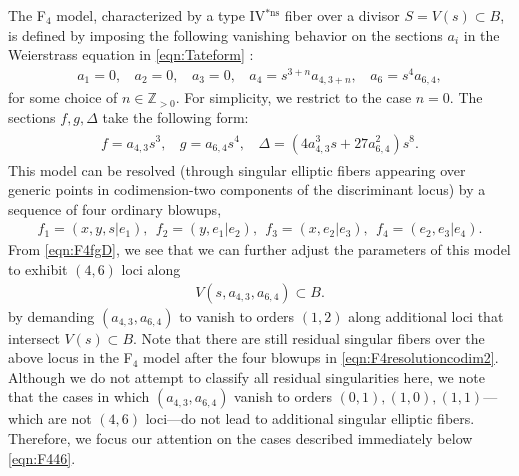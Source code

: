 \documentclass[11pt,oneside,english]{article}
\numberwithin{equation}{section}
\theoremstyle{definition}
\begin{document}
The F$_4$ model, characterized by a type IV$^{*\text{ns}}$ fiber over a divisor $S  = V(s) \subset B$, is defined by imposing the following vanishing behavior on the sections $a_i$ in the Weierstrass equation in \cref{eqn:Tateform} \cite{Esole:2017kyr,Esole:2017rgz}:
	\begin{align}
		a_1 = 0,~~~~ a_2=0,~~~~ a_3 = 0,~~~~ a_4 = s^{3+n} a_{4,3+n} ,~~~~ a_6 =s^4 a_{6,4},
	\end{align}
for some choice of $n \in \mathbb Z_{>0}$. For simplicity, we restrict to the case $n = 0$. The sections $f,g,\Delta$ take the following form:
	\begin{align}	
		\begin{split}
		\label{eqn:F4fgD}
		f = a_{4,3} s^3,~~~~g= a_{6,4} s^4,~~~~\Delta = ( 4 a_{4,3}^3 s+ 27 a_{6,4}^2 ) s^8. 
		\end{split}
	\end{align}
This model can be resolved (through singular elliptic fibers appearing over generic points in codimension-two components of the discriminant locus) by a sequence of four ordinary blowups,
	\begin{align}
		\label{eqn:F4resolutioncodim2}
			 f_1 = (x,y,s|e_1),~~f_2 = (y,e_1|e_2),~~ f_3=(x,e_2|e_3) ,~~ f_4 =  (e_2,e_3|e_4).
	\end{align}
From \cref{eqn:F4fgD}, we see that we can further adjust the parameters of this model to exhibit $(4,6)$ loci along
\begin{align}
	\label{eqn:F446}
		V(s , a_{4,3} , a_{6,4}) \subset B.
	\end{align}
 by demanding $(a_{4,3}, a_{6,4})$ to vanish to orders $(1,2)$ along additional loci that intersect $V(s) \subset B$. 
Note that there are still residual singular fibers over the above locus in the F$_4$ model after the four blowups in \cref{eqn:F4resolutioncodim2}. Although we do not attempt to classify all residual singularities here, we note that the cases in which $(a_{4,3}, a_{6,4})$ vanish to orders $(0,1),(1,0),(1,1)$---which are not $(4,6)$ loci---do not lead to additional singular elliptic fibers. Therefore, we focus our attention on the cases described immediately below \cref{eqn:F446}.
\end{document}

